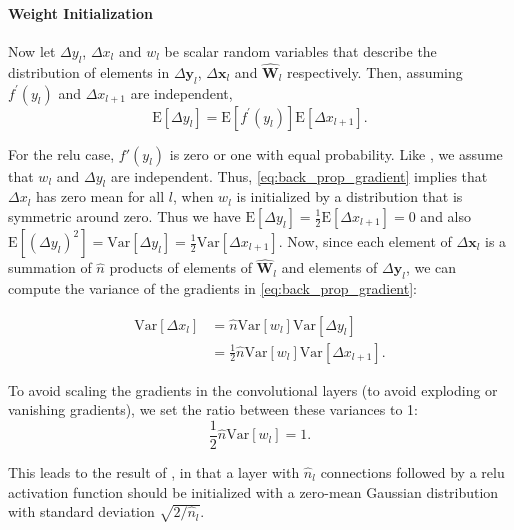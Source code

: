 \documentclass[thesis]{subfiles}
\begin{document}
    
    \newcommand{\Expect}{\mathrm{E}}
    \newcommand{\Var}{\mathrm{Var}}
    
    \paragraph{Weight Initialization}
    Now let $\Delta y_l$, $\Delta x_l$ and $w_l$ be scalar random variables that describe the distribution of elements in $\Delta \mathbf{y}_l$, $\Delta \mathbf{x}_{l}$ and $\hat{\mathbf{W}}_l$ respectively. Then, assuming $f^\prime (y_l)$ and $\Delta x_{l+1}$ are independent,
    \begin{equation}
    \Expect[\Delta y_l] = \Expect[f^\prime (y_l)] \Expect[ \Delta x_{l+1}].
    \end{equation}
    
    For the \gls{relu} case, $f'(y_l)$ is zero or one with equal probability. 
    Like \citet{glorot2010understanding}, we assume that $w_l$ and $\Delta y_l$ are independent. Thus, \cref{eq:back_prop_gradient} implies that $\Delta x_l$ has zero mean for all $l$, when $w_l$ is initialized by a distribution that is symmetric around zero. Thus we have $\Expect[\Delta y_l] = \frac{1}{2}\Expect[\Delta x_{l+1}]= 0$ and also $\Expect[(\Delta y_l)^2] = \Var[\Delta y_l] = \frac{1}{2} \Var[\Delta x_{l+1}]$. Now, since each element of $\Delta \mathbf{x}_l$ is a summation of $\hat n$ products of elements of $\hat{\mathbf{W}}_l$ and elements of $\Delta \mathbf{y}_l$, we can compute the variance of the gradients in \cref{eq:back_prop_gradient}:
    
    \begin{equation}
    \begin{aligned}
    \Var[\Delta x_l] &=  \hat{n} \Var[w_l] \Var[\Delta y_l]\\
    &= \frac{1}{2}   \hat{n} \Var[w_l] \Var [\Delta x_{l+1}].
    \end{aligned}
    \end{equation}
    
    
    To avoid scaling the gradients in the convolutional layers (to avoid exploding or vanishing gradients), we set the ratio between these variances to 1:
    \begin{equation}
    \frac{1}{2} \hat{n} \Var[w_l] = 1.
    \end{equation}
    
    This leads to the result of \citet{He2015b}, in that a layer with $\hat{n}_l$ connections followed by a \gls{relu} activation function should be initialized with a zero-mean Gaussian distribution with standard deviation $\sqrt{2/ \hat{n}_l}$.
    
\end{document}
